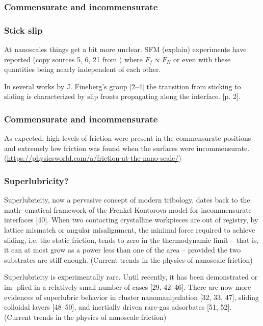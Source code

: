 \subsubsection{Commensurate and incommensurate}
\subsubsection{Stick slip}



At nanoscales things get a bit more unclear. SFM (explain) experiments have reported (copy sources 5, 6, 21 from \cite{mo_friction_2009}) where $F_f \propto F_N$ or even with these quantities being nearly independent of each other.








In several works by J. Fineberg’s group [2–4] the transition from sticking to sliding is characterized by slip fronts propagating along the interface. \cite{Manini_2017}[p. 2]. 

\subsubsection{Commensurate and incommensurate}
As expected, high levels of friction were present in the commensurate positions and extremely low friction was found when the surfaces were incommensurate. (\url{https://physicsworld.com/a/friction-at-the-nano-scale/})


\subsubsection{Superlubricity?}
Superlubricity, now a pervasive concept of modern tribology, dates back to the math- ematical framework of the Frenkel Kontorova model for incommensurate interfaces [40]. When two contacting crystalline workpieces are out of registry, by lattice mismatch or angular misalignment, the minimal force required to achieve sliding, i.e. the static friction, tends to zero in the thermodynamic limit – that is, it can at most grow as a power less than one of the area – provided the two substrates are stiff enough. (Current trends in the physics of nanoscale friction)


Superlubricity is experimentally rare. Until recently, it has been demonstrated or im- plied in a relatively small number of cases [29, 42–46]. There are now more evidences of superlubric behavior in cluster nanomanipulation [32, 33, 47], sliding colloidal layers [48–50], and inertially driven rare-gas adsorbates [51, 52]. (Current trends in the physics of nanoscale friction)


